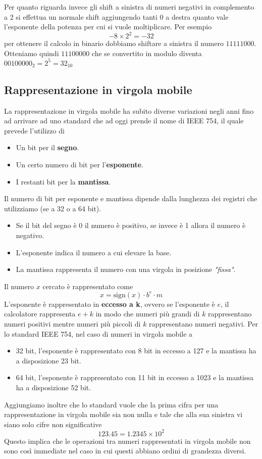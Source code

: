 Per quanto riguarda invece gli shift a sinistra di numeri negativi in complemento a 2 si effettua
un normale shift aggiungendo tanti 0 a destra quanto vale l'esponente della potenza per cui si
vuole moltiplicare. Per esempio
\[ -8 \times 2^2 = -32 \]
per ottenere il calcolo in binario dobbiamo shiftare a sinistra il numero $11111000$. Otteniamo
quindi $11100000$ che se convertito in modulo diventa $00100000_2 = 2^5 = 32_{10}$

\subsection{Rappresentazione in virgola mobile}
La rappresentazione in virgola mobile ha subito diverse variazioni negli anni fino ad arrivare ad
uno standard che ad oggi prende il nome di IEEE 754, il quale prevede l'utilizzo di
\begin{itemize}
	\item Un bit per il \textbf{segno}.
	\item Un certo numero di bit per l'\textbf{esponente}.
	\item I restanti bit per la \textbf{mantissa}.
\end{itemize}
Il numero di bit per esponente e mantissa dipende dalla lunghezza dei registri che utilizziamo (se
a 32 o a 64 bit).
\begin{itemize}
	\item Se il bit del segno è 0 il numero è positivo, se invece è 1 allora il numero è negativo.
	\item L'esponente indica il numero a cui elevare la base.
	\item La mantissa rappresenta il numero con una virgola in posizione \emph{"fissa"}.
\end{itemize}
Il numero $x$ cercato è rappresentato come
\[ x = \text{sign}(x) \cdot b^e \cdot m \]
L'esponente è rappresentato in \textbf{eccesso a k}, ovvero se l'esponente è $e$, il calcolatore
rappresenta $e+k$ in modo che numeri più grandi di $k$ rappresentano numeri positivi mentre numeri
più piccoli di $k$ rappresentano numeri negativi. Per lo standard IEEE 754, nel caso di numeri in
virgola mobile a
\begin{itemize}
	\item 32 bit, l'esponente è rappresentato con 8 bit in eccesso a 127 e la mantissa ha a
	      disposizione 23 bit.
	\item 64 bit, l'esponente è rappresentato con 11 bit in eccesso a 1023 e la mantissa ha a
	      disposizione 52 bit.
\end{itemize}
Aggiungiamo inoltre che lo standard vuole che la prima cifra per una rappresentazione in virgola
mobile sia non nulla e tale che alla sua sinistra vi siano solo cifre non significative
\[ 123.45 = 1.2345 \times 10^2 \]
Questo implica che le operazioni tra numeri rappresentati in virgola mobile non sono così immediate
nel caso in cui questi abbiano ordini di grandezza diversi.

